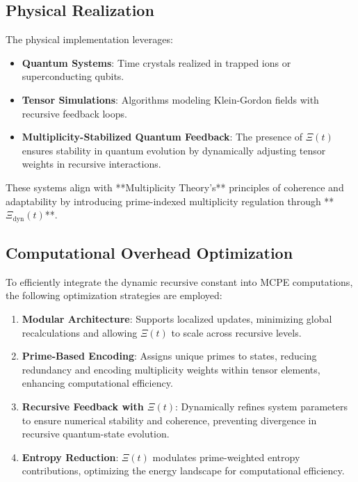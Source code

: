 \documentclass{article}
\theoremstyle{plain}
\begin{document}
\subsection{Physical Realization}
The physical implementation leverages:
\begin{itemize}
    \item \textbf{Quantum Systems}: Time crystals realized in trapped ions or superconducting qubits.
    \item \textbf{Tensor Simulations}: Algorithms modeling Klein-Gordon fields with recursive feedback loops.
    \item \textbf{Multiplicity-Stabilized Quantum Feedback}: The presence of \(\Xi(t) \) ensures stability in quantum evolution by dynamically adjusting tensor weights in recursive interactions.
\end{itemize}
These systems align with **Multiplicity Theory’s** principles of coherence and adaptability by introducing prime-indexed multiplicity regulation through **$\Xi_{\text{dyn}}(t)$**.

\subsection{Computational Overhead Optimization}
To efficiently integrate the dynamic recursive constant into MCPE computations, the following optimization strategies are employed:
\begin{enumerate}
    \item \textbf{Modular Architecture}: Supports localized updates, minimizing global recalculations and allowing \(\Xi(t) \) to scale across recursive levels.
    \item \textbf{Prime-Based Encoding}: Assigns unique primes to states, reducing redundancy and encoding multiplicity weights within tensor elements, enhancing computational efficiency.
    \item \textbf{Recursive Feedback with \(\Xi(t) \)}: Dynamically refines system parameters to ensure numerical stability and coherence, preventing divergence in recursive quantum-state evolution.
    \item \textbf{Entropy Reduction}: \(\Xi(t) \) modulates prime-weighted entropy contributions, optimizing the energy landscape for computational efficiency.
\end{enumerate}
\end{document}
